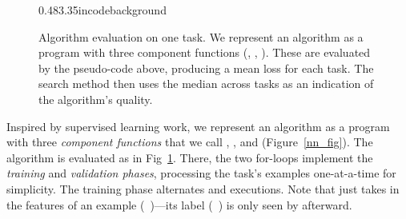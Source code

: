 \begin{figure}[!h]
    \begin{code}{0.48\textwidth}{3.35in}{codebackground}  %
        \codeskip
        \codeskip
        \codeskip
        \codeskip
    \end{code}
\caption{Algorithm evaluation on one task. We represent an algorithm as a program with three component functions (\setup, \predict, \learn). These are evaluated by the pseudo-code above, producing a mean loss for each task. The search method then uses the median across tasks as an indication of the algorithm's quality.}
\label{algorithm_evaluation_fig}
\end{figure}

Inspired by supervised learning work, we represent an algorithm as a program with three \emph{component functions} that we call \setup, \predict, and \learn (\eg Figure~\ref{nn_fig}). The algorithm is evaluated as in Fig~\ref{algorithm_evaluation_fig}. There, the two \mbox{for-loops} implement the \textit{training} and \textit{validation phases}, processing the task's examples one-at-a-time for simplicity. The training phase alternates \predict and \learn executions. Note that \predict just takes in the features of an example (\ie\ )---its label (\ie\ ) is only seen by \learn afterward.

